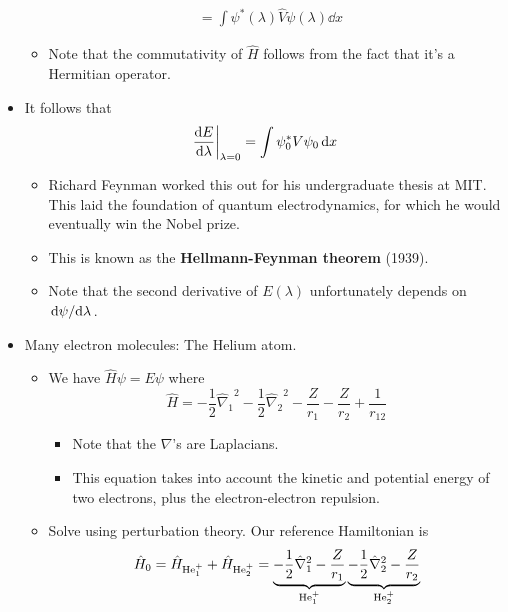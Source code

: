 \documentclass[../notes.tex]{subfiles}
\begin{document}
\begin{itemize}
\begin{align*}
        &= \int\psi^*(\lambda)\hat{V}\psi(\lambda)\dd{x}
    \end{align*}
    \endgroup
    \begin{itemize}
        \item Note that the commutativity of $\hat{H}$ follows from the fact that it's a Hermitian operator.
    \end{itemize}
    \item It follows that
    \begin{equation*}
        \dv{E}{\lambda}\bigg|_{\lambda=0} = \int\psi_0^*V\psi_0\dd{x}
    \end{equation*}
    \begin{itemize}
        \item Richard Feynman worked this out for his undergraduate thesis at MIT. This laid the foundation of quantum electrodynamics, for which he would eventually win the Nobel prize.
        \item This is known as the \textbf{Hellmann-Feynman theorem} (1939).
        \item Note that the second derivative of $E(\lambda)$ unfortunately depends on $\dv*{\psi}{\lambda}$.
    \end{itemize}
    \item Many electron molecules: The Helium atom.
    \begin{itemize}
        \item We have $\hat{H}\psi=E\psi$ where
        \begin{equation*}
            \hat{H} = -\frac{1}{2}{\hat{\nabla}_1}^2-\frac{1}{2}{\hat{\nabla}_2}^2-\frac{Z}{r_1}-\frac{Z}{r_2}+\frac{1}{r_{12}}
        \end{equation*}
        \begin{itemize}
            \item Note that the $\nabla$'s are Laplacians.
            \item This equation takes into account the kinetic and potential energy of two electrons, plus the electron-electron repulsion.
        \end{itemize}
        \item Solve using perturbation theory. Our reference Hamiltonian is
        \begin{equation*}
            \hat{H}_0 = \hat{H}_{\ce{He+}_1}+\hat{H}_{\ce{He+}_2} = \underbrace{-\frac{1}{2}\hat{\nabla}_1^2-\frac{Z}{r_1}}_{\ce{He+}_1}\underbrace{-\frac{1}{2}\hat{\nabla}_2^2-\frac{Z}{r_2}}_{\ce{He+}_2}
        \end{equation*}

\end{itemize}
\end{itemize}
\end{document}
